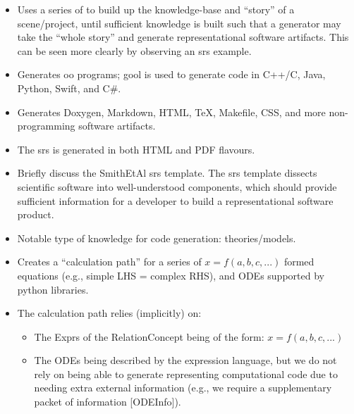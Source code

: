 \begin{itemize}

      \item Uses a series of  to build up the knowledge-base and
            ``story'' of a scene/project, until sufficient knowledge is built
            such that a generator may take the ``whole story'' and generate
            representational software artifacts. This can be seen more clearly
            by observing an \acs{srs} example.

      \item Generates \acs{oo} programs; \acs{gool} is used to generate code in
            C++/C, Java, Python, Swift, and C\#.

      \item Generates Doxygen, Markdown, HTML, TeX, Makefile, CSS, and more
            non-programming software artifacts.

      \item The \acs{srs} is generated in both HTML and PDF flavours.

      \item Briefly discuss the SmithEtAl \acs{srs} template. The \acs{srs}
            template dissects scientific software into well-understood
            components, which should provide sufficient information for a
            developer to build a representational software product.

      \item Notable type of knowledge for code generation: theories/models.

      \item Creates a ``calculation path'' for a series of $x = f(a,b,c,...)$
            formed equations (e.g., simple LHS = complex RHS), and ODEs
            supported by python libraries.

      \item The calculation path relies (implicitly) on:
            \begin{itemize}

                  \item The Exprs of the RelationConcept being of the form: $x =
                              f(a,b,c,...)$

                  \item The ODEs being described by the expression language, but
                        we do not rely on being able to generate representing
                        computational code due to needing extra external
                        information (e.g., we require a supplementary packet of
                        information [ODEInfo]).

            \end{itemize}

\end{itemize}
